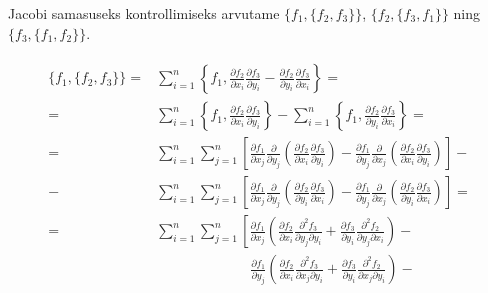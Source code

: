 Jacobi samasuseks kontrollimiseks arvutame $\{f_1, \{f_2, f_3\}\}$,
$\{f_2, \{f_3, f_1\}\}$ ning $\{f_3, \{f_1, f_2\}\}$.

\begin{align}\begin{split}
    \{f_1, \{f_2, f_3\}\} = &\sum_{i=1}^{n} \left\{
        f_1,
        \frac{\partial f_2}{\partial x_i}
        \frac{\partial f_3}{\partial y_i} -
        \frac{\partial f_2}{\partial y_i}
        \frac{\partial f_3}{\partial x_i}
    \right\} = \\
    = &\sum_{i=1}^{n} \left\{
        f_1,
        \frac{\partial f_2}{\partial x_i}
        \frac{\partial f_3}{\partial y_i}
    \right\} - \sum_{i=1}^{n} \left\{
        f_1,
        \frac{\partial f_2}{\partial y_i}
        \frac{\partial f_3}{\partial x_i}
    \right\} = \\
    = &\sum_{i=1}^{n} \sum_{j=1}^{n} \left[
        \frac{\partial f_1}{\partial x_j}
        \frac{\partial}{\partial y_j} \left(
            \frac{\partial f_2}{\partial x_i}
            \frac{\partial f_3}{\partial y_i}
        \right) -
        \frac{\partial f_1}{\partial y_j}
        \frac{\partial}{\partial x_j} \left(
            \frac{\partial f_2}{\partial x_i}
            \frac{\partial f_3}{\partial y_i}
        \right)
    \right] - \\
    - &\sum_{i=1}^{n} \sum_{j=1}^{n} \left[
        \frac{\partial f_1}{\partial x_j}
        \frac{\partial}{\partial y_j} \left(
            \frac{\partial f_2}{\partial y_i}
            \frac{\partial f_3}{\partial x_i}
        \right) -
        \frac{\partial f_1}{\partial y_j}
        \frac{\partial}{\partial x_j} \left(
            \frac{\partial f_2}{\partial y_i}
            \frac{\partial f_3}{\partial x_i}
        \right)
    \right] = \\
    = &\sum_{i=1}^{n} \sum_{j=1}^{n} \left[
        \frac{\partial f_1}{\partial x_j}\left(
            \frac{\partial f_2}{\partial x_i}
            \frac{\partial^2 f_3}{\partial y_j \partial y_i} +
            \frac{\partial f_3}{\partial y_i}
            \frac{\partial^2 f_2}{\partial y_j \partial x_i}
        \right) - \right.\\
        &\phantom{\sum_{i=1}^{n} \sum_{j=1}^{n} [}\ \ 
            \frac{\partial f_1}{\partial y_j}\left(
            \frac{\partial f_2}{\partial x_i}
            \frac{\partial^2 f_3}{\partial x_j \partial y_i} +
            \frac{\partial f_3}{\partial y_i}
            \frac{\partial^2 f_2}{\partial x_j \partial y_i}
        \right) - \\

\end{split}
\end{align}
